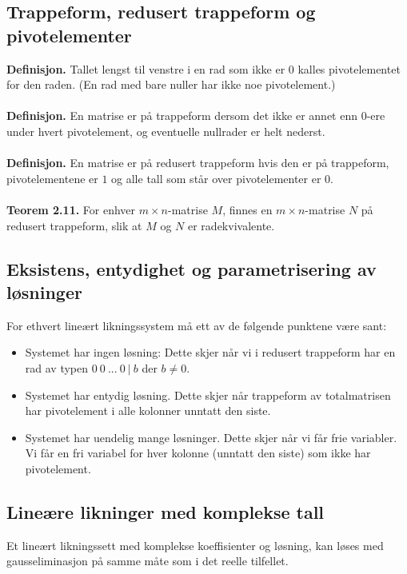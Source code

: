 \documentclass{article}
\begin{document}
\subsection{Trappeform, redusert trappeform og pivotelementer}
\textbf{Definisjon.} Tallet lengst til venstre i en rad som ikke er $0$ kalles pivotelementet for den raden. (En rad med bare nuller har ikke noe pivotelement.)
\\\\
\textbf{Definisjon.} En matrise er på trappeform dersom det ikke er annet enn $0$-ere under hvert pivotelement, og eventuelle nullrader er helt nederst.
\\\\
\textbf{Definisjon.} En matrise er på redusert trappeform hvis den er på trappeform, pivotelementene er $1$ og alle tall som står over pivotelementer er $0$.
\\\\
\textbf{Teorem 2.11.} For enhver $m \times n$-matrise $M$, finnes en $m \times n$-matrise $N$ på redusert trappeform, slik at $M$ og $N$ er radekvivalente.


\subsection{Eksistens, entydighet og parametrisering av løsninger}
For ethvert lineært likningssystem må ett av de følgende punktene være sant:
\begin{itemize}
    \item Systemet har ingen løsning: Dette skjer når vi i redusert trappeform har en rad av typen $ 0 \ 0 \ ... \ 0 \ | \ b $ der $b \neq 0$.
    \item Systemet har entydig løsning. Dette skjer når trappeform av totalmatrisen har pivotelement i alle kolonner unntatt den siste.
    \item Systemet har uendelig mange løsninger. Dette skjer når vi får frie variabler. Vi får en fri variabel for hver kolonne (unntatt den siste) som ikke har pivotelement.
\end{itemize}


\subsection{Lineære likninger med komplekse tall}
Et lineært likningssett med komplekse koeffisienter og løsning, kan løses med gausseliminasjon på samme måte som i det reelle tilfellet.
\end{document}
